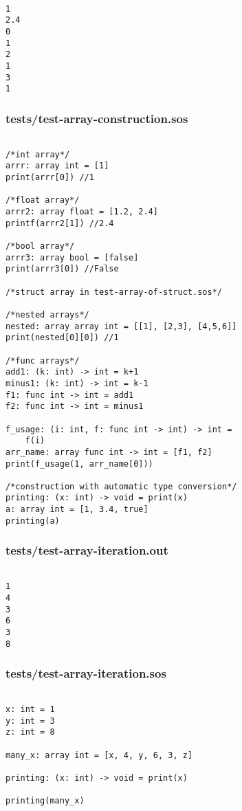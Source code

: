 \documentclass[main.tex]{subfiles}
\begin{document}
\begin{lstlisting}

1
2.4
0
1
2
1
3
1
\end{lstlisting}

\subsubsection{tests/test-array-construction.sos}

\begin{lstlisting}

/*int array*/
arrr: array int = [1]
print(arrr[0]) //1

/*float array*/
arrr2: array float = [1.2, 2.4]
printf(arrr2[1]) //2.4

/*bool array*/
arrr3: array bool = [false]
print(arrr3[0]) //False

/*struct array in test-array-of-struct.sos*/

/*nested arrays*/
nested: array array int = [[1], [2,3], [4,5,6]]
print(nested[0][0]) //1

/*func arrays*/
add1: (k: int) -> int = k+1
minus1: (k: int) -> int = k-1
f1: func int -> int = add1
f2: func int -> int = minus1

f_usage: (i: int, f: func int -> int) -> int =
    f(i)
arr_name: array func int -> int = [f1, f2]
print(f_usage(1, arr_name[0]))

/*construction with automatic type conversion*/
printing: (x: int) -> void = print(x)
a: array int = [1, 3.4, true]
printing(a)
\end{lstlisting}

\subsubsection{tests/test-array-iteration.out}

\begin{lstlisting}

1
4
3
6
3
8\end{lstlisting}

\subsubsection{tests/test-array-iteration.sos}

\begin{lstlisting}

x: int = 1
y: int = 3
z: int = 8

many_x: array int = [x, 4, y, 6, 3, z]

printing: (x: int) -> void = print(x)

printing(many_x)
\end{lstlisting}
\end{document}
